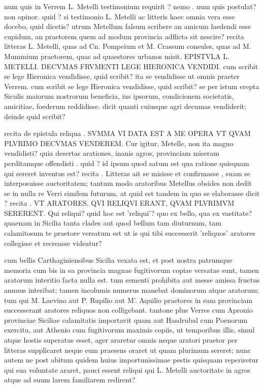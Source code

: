  num quis in Verrem L. Metelli testimonium requirit ? nemo . num quis postulat? non opinor. quid ? si testimonio L. Metelli ac litteris haec omnia vera esse docebo, quid dicetis? utrum Metellum falsum scribere an amicum laedendi esse cupidum, an praetorem quem ad modum provincia adflicta sit nescire? recita litteras L. Metelli, quas ad Cn. Pompeium et M. Crassum consules, quas ad M. Mummium praetorem, quas ad quaestores urbanos misit. EPISTVLA L. METELLI. DECVMAS FRVMENTI LEGE HIERONICA VENDIDI. cum scribit se lege Hieronica vendidisse, quid scribit? ita se vendidisse ut omnis praeter Verrem. cum scribit se lege Hieronica vendidisse, quid scribit? se per istum erepta Siculis maiorum nostrorum beneficia, ius ipsorum, condicionem societatis, amicitiae, foederum reddidisse. dicit quanti cuiusque agri decumas vendiderit; deinde quid scribit?

 recita de epistula reliqua . SVMMA VI DATA EST A ME OPERA VT QVAM PLVRIMO DECVMAS VENDEREM. Cur igitur, Metelle, non ita magno vendidisti? quia desertas arationes, inanis agros, provinciam miseram perditamque offendisti . quid ? id ipsum quod satum est qua ratione quisquam qui sereret inventus est? recita . Litteras ait se misisse et confirmasse , suam se interposuisse auctoritatem; tantum modo aratoribus Metellus obsides non dedit se in nulla re Verri similem futurum. at quid est tandem in quo se elaborasse dicit ? recita . VT ARATORES, QVI RELIQVI ERANT, QVAM PLVRIMVM SERERENT. Qui reliqui? quid hoc est 'reliqui'? quo ex bello, qua ex vastitate? quaenam in Sicilia tanta clades aut quod bellum tam diuturnum, tam calamitosum te praetore versatum est ut is qui tibi successerit 'reliquos' aratores collegisse et recreasse videatur?

 cum bellis Carthaginiensibus Sicilia vexata est, et post nostra patrumque memoria cum bis in ea provincia magnae fugitivorum copiae versatae sunt, tamen aratorum interitio facta nulla est. tum sementi prohibita aut messe amissa fructus annuus interibat; tamen incolumis numerus manebat dominorum atque aratorum; tum qui M. Laevino aut P. Rupilio aut M'. Aquilio praetores in eam provinciam successerant aratores reliquos non colligebant. tantone plus Verres cum Apronio provinciae Siciliae calamitatis importavit quam aut Hasdrubal cum Poenorum exercitu, aut Athenio cum fugitivorum maximis copiis, ut temporibus illis, simul atque hostis superatus esset, ager araretur omnis neque aratori praetor per litteras supplicaret neque eum praesens oraret ut quam plurimum sereret; nunc autem ne post abitum quidem huius importunissimae pestis quisquam reperiretur qui sua voluntate araret, pauci essent reliqui qui L. Metelli auctoritate in agros atque ad suum larem familiarem redirent?

